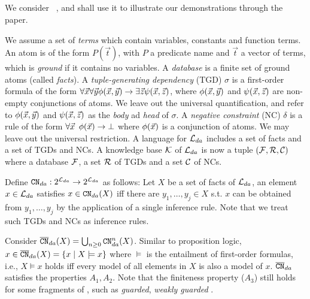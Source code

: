\subsection{\datalogPM}


We consider  \datalogPM~\cite{CALI201257}, and shall use it to illustrate our demonstrations through the paper.

We assume a set \NT of \emph{terms} which contain variables, constants and function terms. An atom is of the form $P(\Vec{t})$, with $P$ a predicate name and $\Vec{t}$ a vector of terms, which is \emph{ground} if it contains no variables. 
A \emph{database} is a finite set of ground atoms (called \emph{facts}).
A \emph{tuple-generating dependency} (TGD) $\sigma$ is a first-order formula of the form $\forall \Vec{x} \forall \Vec{y} \phi(\Vec{x}, \Vec{y}) \rightarrow \exists \Vec{z} \psi(\Vec{x}, \Vec{z})$, where $\phi(\Vec{x}, \Vec{y})$ and $\psi(\Vec{x}, \Vec{z})$ 
are non-empty conjunctions of atoms.
We leave out the universal quantification, and  refer to  $\phi(\Vec{x}, \Vec{y})$ and $\psi(\Vec{x}, \Vec{z})$ as the \emph{body} ad \emph{head} of $\sigma$.
A \emph{negative constraint} (NC) $\delta$ is a rule of the form $\forall \Vec{x}$ $\phi(\Vec{x})\rightarrow \bot$
where $\phi(\Vec{x})$ is a conjunction of atoms. We may leave out the universal restriction.
A language for \datalogPM $\mathcal{L}_{da}$ includes a set of facts and a set of TGDs and NCs. A knowledge base $\mathcal{K}$ of  $\mathcal{L}_{da}$ is now a tuple $(\mathcal{F}, \mathcal{R}, \mathcal{C})$ where a database $\mathcal{F}$, a set $\mathcal{R}$ of TGDs and a set $\mathcal{C}$ of NCs.

Define $\texttt{\textup{CN}}_{da} : 2^{\mathcal{L}_{da}} \to 2^{\mathcal{L}_{da}}$ as follows: Let $X$ be a set of facts of $\mathcal{L}_{da}$, an element $x \in \mathcal{L}_{da}$ satisfies $x \in \texttt{\textup{CN}}_{da}(X)$ iff there are $y_1, \ldots, y_j \in X$ s.t. $x$ can be obtained from $y_1, \ldots, y_j$ by the application of a single inference rule. Note that we treat such TGDs and NCs as inference rules.

Consider $\overline{\texttt{\textup{CN}}}_{da}(X) = \bigcup_{n \geq 0}\texttt{\textup{CN}}_{da}^{n}(X)$. Similar to proposition logic, ~$x \in \overline{\texttt{\textup{CN}}}_{da}(X) = \{x \mid X \models x \}$ where $\models$ is the entailment of first-order formulas, i.e., $X \models x$ holds iff every model of all elements in $X$ is also a model of $x$. 
$\overline{\texttt{\textup{CN}}}_{da}$ satisfies the properties $A_1, A_2$.
Note that the finiteness property ($A_3$) still holds for some fragments of \datalogPM, such as \emph{guarded}, \emph{weakly guarded} \datalogPM. 

